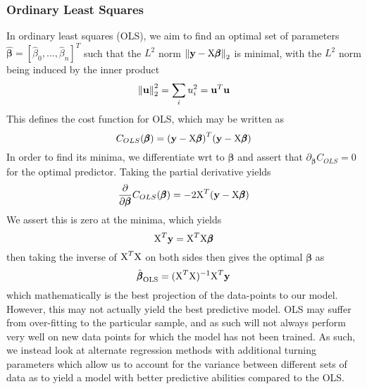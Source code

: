 \documentclass[reprint, english, nofootinbib]{revtex4-2}
\begin{document}
        \subsubsection{Ordinary Least Squares}
            \noindent
            In ordinary least squares (OLS), we aim to find an optimal set of parameters $\pmb{\hat\beta} = [\hat\beta_0, \dots, \hat\beta_n]^T$ such that the $L^2$ norm $\norm{\mathbf y - \textup{X}\pmb{\beta}}_2$ is minimal, with the $L^2$ norm being induced by the inner product
            \begin{equation}
                \norm{\mathbf u}_2^2 = \sum_i u_i^2 = \mathbf u^T \mathbf u
            \end{equation}
            This defines the cost function for OLS, which may be written as
            \begin{equation}
                C_{OLS}(\pmb \beta)
                = \qty(\mathbf y - \textup{X}\pmb \beta)^T(\mathbf y - \textup{X}\pmb \beta)
            \end{equation}
            In order to find its minima, we differentiate wrt to $\pmb\beta$ and assert that $\partial_{\pmb\beta}C_{OLS} = 0$ for the optimal predictor. Taking the partial derivative yields
            \begin{align}
                \begin{split}
                \pdv{\pmb\beta}C_{OLS}(\pmb\beta) = -2\textup{X}^T\qty(\mathbf y - \textup X\pmb \beta)
                \end{split}
            \end{align}
            We assert this is zero at the minima, which yields
            \begin{equation}
                \textup{X}^T\mathbf y = \textup{X}^T\textup{X}\pmb\beta
            \end{equation}
            then taking the inverse of $\textup{X}^T\textup{X}$ on both sides then gives the optimal $\pmb\beta$ as
            \begin{equation}\label{eqn:OLS optimal beta}
                \hat{\pmb \beta}_{\textup{OLS}} = (\textup{X}^T\textup{X})^{-1}\textup{X}^T\mathbf y
            \end{equation}
            which mathematically is the best projection of the data-points to our model. However, this may not actually yield the best predictive model. OLS may suffer from over-fitting to the particular sample, and as such will not always perform very well on new data points for which the model has not been trained. As such, we instead look at alternate regression methods with additional turning parameters which allow us to account for the variance between different sets of data as to yield a model with better predictive abilities compared to the OLS.
\end{document}
